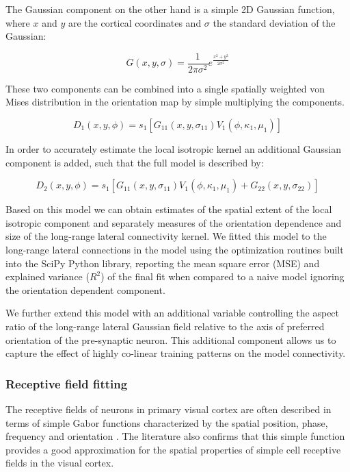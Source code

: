 The Gaussian component on the other hand is a simple 2D Gaussian
function, where $x$ and $y$ are the cortical coordinates and $\sigma$
the standard deviation of the Gaussian:

\begin{equation}
G(x, y, \sigma) = \frac{1}{2 \pi \sigma^2} e^{\frac{x^2+y^2}{2
    \sigma^2}}
\end{equation}

These two components can be combined into a single spatially weighted
von Mises distribution in the orientation map by simple multiplying the
components.

\begin{equation}
D_1(x, y, \phi) = s_1 [G_{11}(x, y, \sigma_{11}) V_1(\phi, \kappa_1, \mu_1)]
\end{equation}

In order to accurately estimate the local isotropic kernel an
additional Gaussian component is added, such that the full model is
described by:

\begin{equation}
D_2(x, y, \phi) = s_1 [G_{11}(x, y, \sigma_{11}) V_1(\phi, \kappa_1, \mu_1) + G_{22}(x, y, \sigma_{22})]
\end{equation}

Based on this model we can obtain estimates of the spatial extent of
the local isotropic component and separately measures of the
orientation dependence and size of the long-range lateral connectivity
kernel. We fitted this model to the long-range lateral connections in
the model using the optimization routines built into the SciPy Python
library, reporting the mean square error (MSE) and explained variance
($R^2$) of the final fit when compared to a naive model ignoring the
orientation dependent component.

We further extend this model with an additional variable controlling
the aspect ratio of the long-range lateral Gaussian field relative to
the axis of preferred orientation of the pre-synaptic neuron. This
additional component allows us to capture the effect of highly
co-linear training patterns on the model connectivity.

\subsubsection{Receptive field fitting} \label{rffitting}

The receptive fields of neurons in primary visual cortex are often
described in terms of simple Gabor functions characterized by the
spatial position, phase, frequency and orientation
\citep{Jones1987,Ringach2002b}. The literature also confirms that this
simple function provides a good approximation for the spatial
properties of simple cell receptive fields in the visual cortex.

